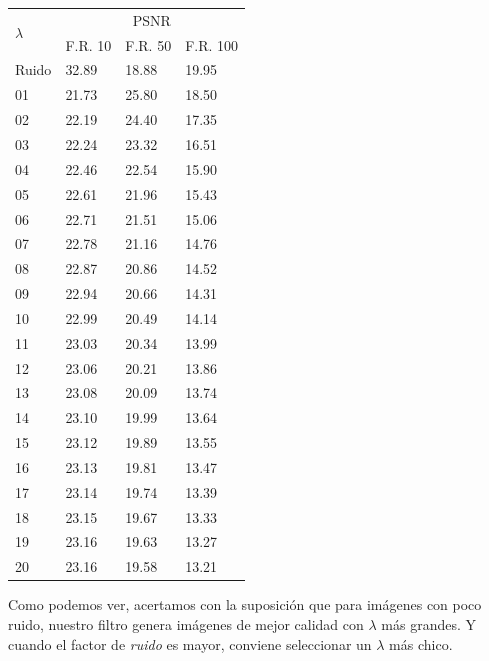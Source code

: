 \documentclass[a4paper]{article}
\begin{document}
\vspace{2em}
\begin{center}
\begin{tabular}{|l|l|l|l|}
  \hline
  \multirow{2}{*}{$\lambda$} & \multicolumn{3}{|c|}{PSNR} \\
  \cline{2-4}
   & F.R. 10 & F.R. 50 & F.R. 100 \\ \hline

  Ruido	 & 	32.89	 & 	18.88	 & 	19.95 \\
  01	 & 	21.73	 & 	25.80	 & 	18.50 \\
  02	 & 	22.19	 & 	24.40	 & 	17.35 \\
  03	 & 	22.24	 & 	23.32	 & 	16.51 \\
  04	 & 	22.46	 & 	22.54	 & 	15.90 \\
  05	 & 	22.61	 & 	21.96	 & 	15.43 \\
  06	 & 	22.71	 & 	21.51	 & 	15.06 \\
  07	 & 	22.78	 & 	21.16	 & 	14.76 \\
  08	 & 	22.87	 & 	20.86	 & 	14.52 \\
  09	 & 	22.94	 & 	20.66	 & 	14.31 \\
  10	 & 	22.99	 & 	20.49	 & 	14.14 \\
  11	 & 	23.03	 & 	20.34	 & 	13.99 \\
  12	 & 	23.06	 & 	20.21	 & 	13.86 \\
  13	 & 	23.08	 & 	20.09	 & 	13.74 \\
  14	 & 	23.10	 & 	19.99	 & 	13.64 \\
  15	 & 	23.12	 & 	19.89	 & 	13.55 \\
  16	 & 	23.13	 & 	19.81	 & 	13.47 \\
  17	 & 	23.14	 & 	19.74	 & 	13.39 \\
  18	 & 	23.15	 & 	19.67	 & 	13.33 \\
  19	 & 	23.16	 & 	19.63	 & 	13.27 \\
  20	 & 	23.16	 & 	19.58	 & 	13.21 \\
  \hline
\end{tabular}
\end{center}

Como podemos ver, acertamos con la suposición que para imágenes con poco ruido, nuestro filtro genera imágenes de mejor calidad con $\lambda$ más grandes. Y cuando el factor de \textit{ruido} es mayor, conviene seleccionar un $\lambda$ más chico.

\end{document}
